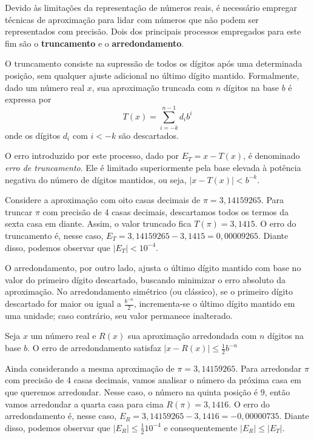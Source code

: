 Devido às limitações da representação de números reais, é necessário empregar
técnicas de aproximação para lidar com números que não podem ser representados
com precisão. Dois dos principais processos empregados para este fim são o
\textbf{truncamento} e o \textbf{arredondamento}.

O truncamento consiste na supressão de todos os dígitos após uma determinada
posição, sem qualquer ajuste adicional no último dígito mantido. Formalmente,
dado um número real \( x \), sua aproximação truncada com \( n \) dígitos na
base \( b \) é expressa por
\[
  T(x) = \sum_{i = -k}^{n-1} d_i b^i
\]
onde os dígitos \( d_i \) com \( i < -k \) são descartados.

O erro introduzido por este processo, dado por $E_T = x-T(x)$, é denominado
\textit{erro de truncamento}. Ele é limitado superiormente pela base elevada à
potência negativa do número de dígitos mantidos, ou seja, $|x - T(x)| <
  b^{-k}$.

\begin{ex}
  Considere a aproximação com oito casas decimais de \(\pi = 3,14159265\).
  Para truncar $\pi$  com precisão de 4 casas decimais, descartamos todos os termos da sexta casa em diante. Assim, o valor truncado fica
  $T(\pi) = 3,1415$.
  O erro do truncamento é, nesse caso, $E_T = 3,14159265 - 3,1415 = 0,00009265$. Diante disso, podemos observar que $|E_T| < 10^{-4}$.
\end{ex}

O arredondamento, por outro lado, ajusta o último dígito mantido com base no
valor do primeiro dígito descartado, buscando minimizar o erro absoluto da
aproximação. No arredondamento simétrico (ou clássico), se o primeiro dígito
descartado for maior ou igual a \( \frac{b^{-n}}{2} \), incrementa-se o último
dígito mantido em uma unidade; caso contrário, seu valor permanece inalterado.

Seja \( x \) um número real e \( R(x) \) sua aproximação arredondada com \( n
\) dígitos na base \( b \). O erro de arredondamento satisfaz $|x - R(x)| \leq
  \frac{1}{2} b^{-n}$

\begin{ex}
  Ainda considerando a mesma aproximação de \(\pi = 3,14159265\).
  Para arredondar $\pi$  com precisão de 4 casas decimais, vamos analisar o número da próxima casa em que queremos arredondar. Nesse caso, o número na quinta posição é 9, então vamos arredondar a quarta casa para cima $R(\pi) = 3,1416$. O erro do arredondamento é, nesse caso, $E_R = 3,14159265 - 3,1416  = -0,00000735$. Diante disso, podemos observar que $|E_R| \leq  \frac{ 1}{2}10^{-4}$ e consequentemente $|E_R| \leq  |E_T|$.
\end{ex}

